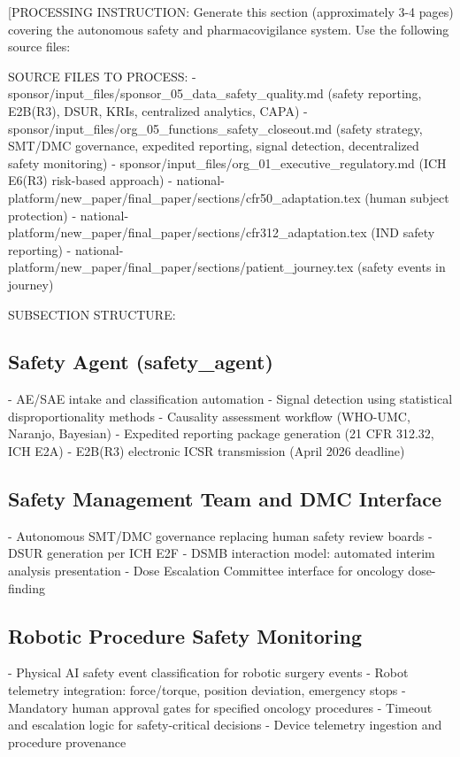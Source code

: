 
[PROCESSING INSTRUCTION: Generate this section (approximately 3-4 pages) covering the
autonomous safety and pharmacovigilance system. Use the following source files:

SOURCE FILES TO PROCESS:
- sponsor/input\_files/sponsor\_05\_data\_safety\_quality.md (safety reporting, E2B(R3), DSUR,
  KRIs, centralized analytics, CAPA)
- sponsor/input\_files/org\_05\_functions\_safety\_closeout.md (safety strategy, SMT/DMC governance,
  expedited reporting, signal detection, decentralized safety monitoring)
- sponsor/input\_files/org\_01\_executive\_regulatory.md (ICH E6(R3) risk-based approach)
- national-platform/new\_paper/final\_paper/sections/cfr50\_adaptation.tex (human subject protection)
- national-platform/new\_paper/final\_paper/sections/cfr312\_adaptation.tex (IND safety reporting)
- national-platform/new\_paper/final\_paper/sections/patient\_journey.tex (safety events in journey)

SUBSECTION STRUCTURE:

\subsection{Safety Agent (safety\_agent)}
- AE/SAE intake and classification automation
- Signal detection using statistical disproportionality methods
- Causality assessment workflow (WHO-UMC, Naranjo, Bayesian)
- Expedited reporting package generation (21 CFR 312.32, ICH E2A)
- E2B(R3) electronic ICSR transmission (April 2026 deadline)

\subsection{Safety Management Team and DMC Interface}
- Autonomous SMT/DMC governance replacing human safety review boards
- DSUR generation per ICH E2F
- DSMB interaction model: automated interim analysis presentation
- Dose Escalation Committee interface for oncology dose-finding

\subsection{Robotic Procedure Safety Monitoring}
- Physical AI safety event classification for robotic surgery events
- Robot telemetry integration: force/torque, position deviation, emergency stops
- Mandatory human approval gates for specified oncology procedures
- Timeout and escalation logic for safety-critical decisions
- Device telemetry ingestion and procedure provenance


